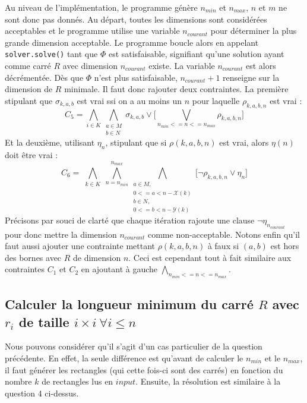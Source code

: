 \documentclass[a4paper]{article}
\begin{document}
Au niveau de l'implémentation, le programme génère $n_{min}$ et $n_{max}$, $n$ et $m$ ne sont donc pas donnés. Au départ, toutes les dimensions sont considérées acceptables et le programme utilise une variable $n_{courant}$ pour déterminer la plus grande dimension acceptable. Le programme boucle alors en appelant \texttt{solver.solve()} tant que $\Phi$ est satisfaisable, signifiant qu'une solution ayant comme carré $R$ avec dimension $n_{courant}$ existe. La variable $n_{courant}$ est alors décrémentée. Dès que $\Phi$ n'est plus satisfaisable, $n_{courant} + 1$ renseigne sur la dimension de $R$ minimale.
Il faut donc rajouter deux contraintes. La première stipulant que $\sigma_{k,a,b}$ est vrai ssi on a au moins un $n$ pour laquelle $\rho_{k,a,b,n}$ est vrai :
\begin{equation*}
C_5 = \bigwedge\limits_{i\in K} \bigwedge\limits_{\substack{a \in M \\ b \in N}} \sigma_{k,a,b} \lor \bigg[ \bigvee\limits_{n_{min} <= n <= n_{max}} \rho_{k,a,b,n} \bigg]
\end{equation*}
Et la deuxième, utilisant $\eta_n$, stipulant que si $\rho(k,a,b,n)$ est vrai, alors $\eta(n)$ doit être vrai :
\begin{equation*}
C_6 = 	\bigwedge\limits_{\substack{k\in K}}
			\bigwedge\limits_{n = n_{min}}^{n_{max}}
				\bigwedge\limits_{\substack{a \in M, \\ 0 <= a < n - \mathcal{X}(k) \\ b \in N, \\ 0 <= b < n - \mathcal{Y}(k)}}
					\big[
						\lnot \rho_{k,a,b,n} \lor \eta_n
					\big]
\end{equation*}
Précisons par souci de clarté que chaque itération rajoute une clause $\lnot \eta_{n_{courant}}$ pour donc mettre la dimension $n_{courant}$ comme non-acceptable. 
Notons enfin qu'il faut aussi ajouter une contrainte mettant $\rho(k,a,b,n)$ à faux si $(a,b)$ est hors des bornes avec $R$ de dimension $n$. Ceci est cependant tout à fait similaire aux contraintes $C_1$ et $C_2$ en ajoutant à gauche $\bigwedge\limits_{n_{min} <= n <= n_{max}}$.

\subsection{Calculer la longueur minimum du carré $R$ avec $r_i$ de taille $i\times i \ \forall i \leq n$}
Nous pouvons considérer qu'il s'agit d'un cas particulier de la question précédente. En effet, la seule différence est qu'avant de calculer le $n_{min}$ et le $n_{max}$, il faut générer les rectangles (qui cette fois-ci sont des carrés) en fonction du nombre $k$ de rectangles lus en $input$. Ensuite, la résolution est similaire à la question 4 ci-dessus.
\end{document}
